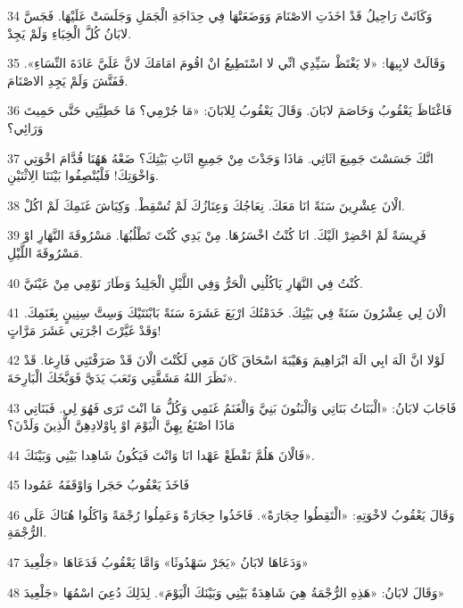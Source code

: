 \par 34 وَكَانَتْ رَاحِيلُ قَدْ اخَذَتِ الاصْنَامَ وَوَضَعَتْهَا فِي حِدَاجَةِ الْجَمَلِ وَجَلَسَتْ عَلَيْهَا. فَجَسَّ لابَانُ كُلَّ الْخِبَاءِ وَلَمْ يَجِدْ.
\par 35 وَقَالَتْ لابِيهَا: «لا يَغْتَظْ سَيِّدِي انِّي لا اسْتَطِيعُ انْ اقُومَ امَامَكَ لانَّ عَلَيَّ عَادَةَ النِّسَاءِ». فَفَتَّشَ وَلَمْ يَجِدِ الاصْنَامَ.
\par 36 فَاغْتَاظَ يَعْقُوبُ وَخَاصَمَ لابَانَ. وَقَالَ يَعْقُوبُ لِلابَانَ: «مَا جُرْمِي؟ مَا خَطِيَّتِي حَتَّى حَمِيتَ وَرَائِي؟
\par 37 انَّكَ جَسَسْتَ جَمِيعَ اثَاثِي. مَاذَا وَجَدْتَ مِنْ جَمِيعِ اثَاثِ بَيْتِكَ؟ ضَعْهُ هَهُنَا قُدَّامَ اخْوَتِي وَاخْوَتِكَ! فَلْيُنْصِفُوا بَيْنَنَا الِاثْنَيْنِ.
\par 38 الْانَ عِشْرِينَ سَنَةً انَا مَعَكَ. نِعَاجُكَ وَعِنَازُكَ لَمْ تُسْقِطْ. وَكِبَاشَ غَنَمِكَ لَمْ اكُلْ.
\par 39 فَرِيسَةً لَمْ احْضِرْ الَيْكَ. انَا كُنْتُ اخْسَرُهَا. مِنْ يَدِي كُنْتَ تَطْلُبُهَا. مَسْرُوقَةَ النَّهَارِ اوْ مَسْرُوقَةَ اللَّيْلِ.
\par 40 كُنْتُ فِي النَّهَارِ يَاكُلُنِي الْحَرُّ وَفِي اللَّيْلِ الْجَلِيدُ وَطَارَ نَوْمِي مِنْ عَيْنَيَّ.
\par 41 الْانَ لِي عِشْرُونَ سَنَةً فِي بَيْتِكَ. خَدَمْتُكَ ارْبَعَ عَشَرَةَ سَنَةً بَابْنَتَيْكَ وَسِتَّ سِنِينٍ بِغَنَمِكَ. وَقَدْ غَيَّرْتَ اجْرَتِي عَشَرَ مَرَّاتٍ!
\par 42 لَوْلا انَّ الَهَ ابِي الَهَ ابْرَاهِيمَ وَهَيْبَةَ اسْحَاقَ كَانَ مَعِي لَكُنْتَ الْانَ قَدْ صَرَفْتَنِي فَارِغا. قَدْ نَظَرَ اللهُ مَشَقَّتِي وَتَعَبَ يَدَيَّ فَوَبَّخَكَ الْبَارِحَةَ».
\par 43 فَاجَابَ لابَانُ: «الْبَنَاتُ بَنَاتِي وَالْبَنُونَ بَنِيَّ وَالْغَنَمُ غَنَمِي وَكُلُّ مَا انْتَ تَرَى فَهُوَ لِي. فَبَنَاتِي مَاذَا اصْنَعُ بِهِنَّ الْيَوْمَ اوْ بِاوْلادِهِنَّ الَّذِينَ وَلَدْنَ؟
\par 44 فَالْانَ هَلُمَّ نَقْطَعْ عَهْدا انَا وَانْتَ فَيَكُونُ شَاهِدا بَيْنِي وَبَيْنَكَ».
\par 45 فَاخَذَ يَعْقُوبُ حَجَرا وَاوْقَفَهُ عَمُودا
\par 46 وَقَالَ يَعْقُوبُ لاخْوَتِهِ: «الْتَقِطُوا حِجَارَةً». فَاخَذُوا حِجَارَةً وَعَمِلُوا رُجْمَةً وَاكَلُوا هُنَاكَ عَلَى الرُّجْمَةِ.
\par 47 وَدَعَاهَا لابَانُ «يَجَرْ سَهْدُوثَا» وَامَّا يَعْقُوبُ فَدَعَاهَا «جَلْعِيدَ»
\par 48 وَقَالَ لابَانُ: «هَذِهِ الرُّجْمَةُ هِيَ شَاهِدَةٌ بَيْنِي وَبَيْنَكَ الْيَوْمَ». لِذَلِكَ دُعِيَ اسْمُهَا «جَلْعِيدَ»
